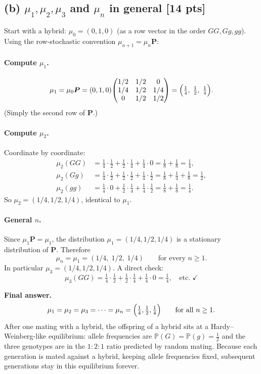 \documentclass[12pt]{article}
\newcommand{\Prb}{\mathbb{P}}
\newcommand{\mat}[1]{\bm{#1}}
\begin{document}
\subsection*{(b) $\mu_1,\mu_2,\mu_3$ and $\mu_n$ in general [14 pts]}

Start with a hybrid: $\mu_0=(0,1,0)$ (as a row vector in the order $GG,Gg,gg$). Using the row-stochastic convention $\mu_{n+1}=\mu_n\mat{P}$:

\paragraph{Compute $\mu_1$.}
\[
  \mu_1 = \mu_0 \mat{P}
  = (0,1,0)\!\begin{pmatrix}1/2 & 1/2 & 0\\ 1/4 & 1/2 & 1/4\\ 0 & 1/2 & 1/2\end{pmatrix}
  = \Bigl(\tfrac14,\;\tfrac12,\;\tfrac14\Bigr).
\]
(Simply the second row of $\mat P$.)

\paragraph{Compute $\mu_2$.} Coordinate by coordinate:
\begin{align*}
  \mu_2(GG) &= \tfrac14\cdot\tfrac12 + \tfrac12\cdot\tfrac14 + \tfrac14\cdot 0 = \tfrac18+\tfrac18 = \tfrac14,\\
  \mu_2(Gg) &= \tfrac14\cdot\tfrac12 + \tfrac12\cdot\tfrac12 + \tfrac14\cdot\tfrac12 = \tfrac18+\tfrac14+\tfrac18 = \tfrac12,\\
  \mu_2(gg) &= \tfrac14\cdot 0 + \tfrac12\cdot\tfrac14 + \tfrac14\cdot\tfrac12 = \tfrac18+\tfrac18 = \tfrac14.
\end{align*}
So $\mu_2=(1/4,1/2,1/4)$, identical to $\mu_1$.

\paragraph{General $n$.} Since $\mu_1\mat{P}=\mu_1$, the distribution $\mu_1=(1/4,1/2,1/4)$ is a stationary distribution of $\mat P$. Therefore
\[
  \mu_n = \mu_1 = (1/4,\;1/2,\;1/4)\qquad\text{for every }n\ge 1.
\]
In particular $\mu_3=(1/4,1/2,1/4)$. A direct check:
\[
  \mu_3(GG)=\tfrac14\cdot\tfrac12+\tfrac12\cdot\tfrac14+\tfrac14\cdot 0 = \tfrac14,\quad\text{etc.}\;\checkmark
\]

\textbf{Final answer.}
\[
  \mu_1=\mu_2=\mu_3=\cdots=\mu_n=\Bigl(\tfrac14,\tfrac12,\tfrac14\Bigr)\qquad\text{for all }n\ge 1.
\]
After one mating with a hybrid, the offspring of a hybrid sits at a Hardy--Weinberg-like equilibrium: allele frequencies are $\Prb(G)=\Prb(g)=\tfrac12$ and the three genotypes are in the $1{:}2{:}1$ ratio predicted by random mating. Because each generation is mated against a hybrid, keeping allele frequencies fixed, subsequent generations stay in this equilibrium forever.
\end{document}
